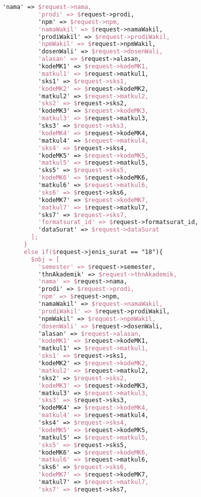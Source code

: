 \begin{lstlisting}[language=tex,basicstyle=\tiny,caption=PesanansuratController.php]
          'nama' => $request->nama,
          'prodi' => $request->prodi,
          'npm' => $request->npm,
          'namaWakil' => $request->namaWakil,
          'prodiWakil' => $request->prodiWakil,
          'npmWakil' => $request->npmWakil,
          'dosenWali' => $request->dosenWali,
          'alasan' => $request->alasan,
          'kodeMK1' => $request->kodeMK1,
          'matkul1' => $request->matkul1,
          'sks1' => $request->sks1,
          'kodeMK2' => $request->kodeMK2,
          'matkul2' => $request->matkul2,
          'sks2' => $request->sks2,
          'kodeMK3' => $request->kodeMK3,
          'matkul3' => $request->matkul3,
          'sks3' => $request->sks3,
          'kodeMK4' => $request->kodeMK4,
          'matkul4' => $request->matkul4,
          'sks4' => $request->sks4,
          'kodeMK5' => $request->kodeMK5,
          'matkul5' => $request->matkul5,
          'sks5' => $request->sks5,
          'kodeMK6' => $request->kodeMK6,
          'matkul6' => $request->matkul6,
          'sks6' => $request->sks6,
          'kodeMK7' => $request->kodeMK7,
          'matkul7' => $request->matkul7,
          'sks7' => $request->sks7,
          'formatsurat_id' => $request->formatsurat_id,
          'dataSurat' => $request->dataSurat
        ];
      }
      else if($request->jenis_surat == "18"){
        $obj = [
          'semester' => $request->semester,
          'thnAkademik' => $request->thnAkademik,
          'nama' => $request->nama,
          'prodi' => $request->prodi,
          'npm' => $request->npm,
          'namaWakil' => $request->namaWakil,
          'prodiWakil' => $request->prodiWakil,
          'npmWakil' => $request->npmWakil,
          'dosenWali' => $request->dosenWali,
          'alasan' => $request->alasan,
          'kodeMK1' => $request->kodeMK1,
          'matkul1' => $request->matkul1,
          'sks1' => $request->sks1,
          'kodeMK2' => $request->kodeMK2,
          'matkul2' => $request->matkul2,
          'sks2' => $request->sks2,
          'kodeMK3' => $request->kodeMK3,
          'matkul3' => $request->matkul3,
          'sks3' => $request->sks3,
          'kodeMK4' => $request->kodeMK4,
          'matkul4' => $request->matkul4,
          'sks4' => $request->sks4,
          'kodeMK5' => $request->kodeMK5,
          'matkul5' => $request->matkul5,
          'sks5' => $request->sks5,
          'kodeMK6' => $request->kodeMK6,
          'matkul6' => $request->matkul6,
          'sks6' => $request->sks6,
          'kodeMK7' => $request->kodeMK7,
          'matkul7' => $request->matkul7,
          'sks7' => $request->sks7,

\end{lstlisting}

